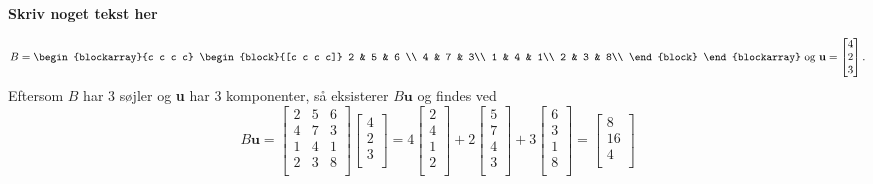 \begin{eks}
\label{Matrix-vektor}
%
\textbf{Skriv noget tekst her}
%
\begin{center} 
$$B=
\begin{blockarray}{c c c c}
\begin{block}{[c c c c]}
2 & 5 & 6 \\
4 & 7 & 3\\
1 & 4 & 1\\
2 & 3 & 8\\
\end{block}
\end{blockarray}
%
\text{ og }
%
\textbf{u}=
\begin{bmatrix}
4 \\
2 \\
3 \\ 
\end{bmatrix}.
$$
%
Eftersom $B$ har 3 søjler og \textbf{u} har 3 komponenter, så eksisterer $B\textbf{u}$ og findes ved
$$
B\textbf{u}=
\begin{bmatrix}
2 & 5 & 6 \\
4 & 7 & 3\\
1 & 4 & 1\\
2 & 3 & 8\\
\end{bmatrix}
\begin{bmatrix}
4 \\
2 \\
3 \\ 
\end{bmatrix}
=4
\begin{bmatrix}
2\\
4\\
1\\
2\\
\end{bmatrix}
+2
\begin{bmatrix}
5\\
7\\
4\\
3\\
\end{bmatrix}
+3
\begin{bmatrix}
6\\
3\\
1\\
8\\
\end{bmatrix}
=
\begin{bmatrix}
8\\
16\\
4\\

\end{bmatrix}$$
\end{center}
\end{eks}
